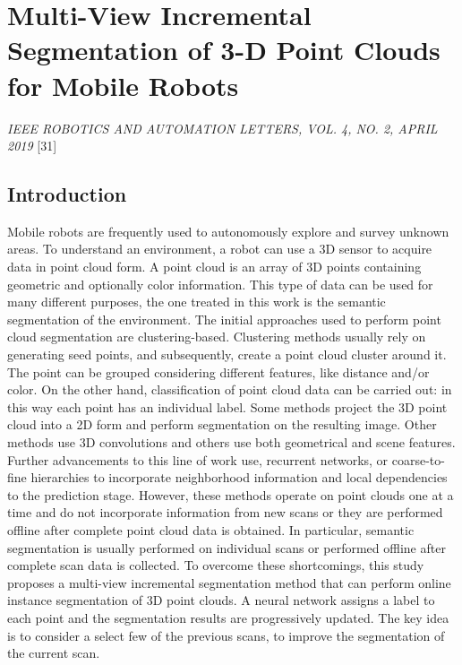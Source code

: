 \section{Multi-View Incremental Segmentation of 3-D Point Clouds for
Mobile Robots}\label{header-n915}

\emph{IEEE ROBOTICS AND AUTOMATION LETTERS, VOL. 4, NO. 2, APRIL 2019}
{[}31{]}

\subsection{Introduction}\label{header-n917}

Mobile robots are frequently used to autonomously explore and survey
unknown areas. To understand an environment, a robot can use a 3D sensor
to acquire data in point cloud form. A point cloud is an array of 3D
points containing geometric and optionally color information. This type
of data can be used for many different purposes, the one treated in this
work is the semantic segmentation of the environment. The initial
approaches used to perform point cloud segmentation are
clustering-based. Clustering methods usually rely on generating seed
points, and subsequently, create a point cloud cluster around it. The
point can be grouped considering different features, like distance
and/or color. On the other hand, classification of point cloud data can
be carried out: in this way each point has an individual label. Some
methods project the 3D point cloud into a 2D form and perform
segmentation on the resulting image. Other methods use 3D convolutions
and others use both geometrical and scene features. Further advancements
to this line of work use, recurrent networks, or coarse-to-fine
hierarchies to incorporate neighborhood information and local
dependencies to the prediction stage. However, these methods operate on
point clouds one at a time and do not incorporate information from new
scans or they are performed offline after complete point cloud data is
obtained. In particular, semantic segmentation is usually performed on
individual scans or performed offline after complete scan data is
collected. To overcome these shortcomings, this study proposes a
multi-view incremental segmentation method that can perform online
instance segmentation of 3D point clouds. A neural network assigns a
label to each point and the segmentation results are progressively
updated. The key idea is to consider a select few of the previous scans,
to improve the segmentation of the current scan.

